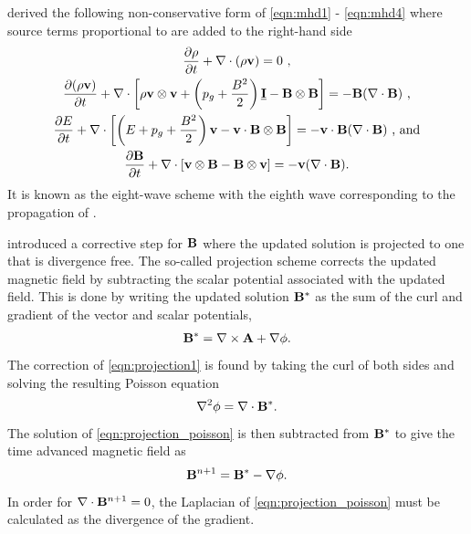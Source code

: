\citet{Powell:1999} derived the following non-conservative form of \eqref{eqn:mhd1} - \eqref{eqn:mhd4} where source terms proportional to  are added to the right-hand side
\begin{gather}
\label{eqn:8wave1} \frac{\partial \rho}{\partial t} + \mathbf{\nabla} \cdot \left(\rho\mathbf{v}\right) = 0 \text{ ,} \\
\label{eqn:8wave2} \frac{\partial (\rho \mathbf{v})}{\partial t} + \mathbf{\nabla} \cdot \left[ \rho\mathbf{v} \otimes \mathbf{v} + \left( p_g + \frac{B^2}{2}\right)\underline{\mathbf{I}} - \mathbf{B} \otimes \mathbf{B}\right]  = -\mathbf{B}(\mathbf{\nabla} \cdot \mathbf{B}) \text{ ,}\\
\label{eqn:8wave3} \frac{\partial E}{\partial t} + \mathbf{\nabla} \cdot \left[ \left(E + p_g + \frac{B^2}{2}\right)\mathbf{v} - \mathbf{v} \cdot \mathbf{B} \otimes \mathbf{B}\right]  = -\mathbf{v}\cdot\mathbf{B}(\mathbf{\nabla} \cdot \mathbf{B}) \text{ , and} \\
\label{eqn:8wave4} \frac{\partial \mathbf{B}}{\partial t} + \mathbf{\nabla} \cdot \left[ \mathbf{v} \otimes \mathbf{B} - \mathbf{B} \otimes \mathbf{v}\right]  = -\mathbf{v}(\mathbf{\nabla} \cdot \mathbf{B}) \text{.}
\end{gather}
It is known as the eight-wave scheme with the eighth wave corresponding to the propagation of .  

\citet{Brackbill:1980} introduced a corrective step for $\mathbf{B}$ where the updated solution is projected to one that is  divergence free.  The so-called projection scheme corrects the updated magnetic field by subtracting the scalar potential associated with the updated field.  This is done by writing the updated solution $\mathbf{B}^*$ as the sum of the curl and gradient of the vector and scalar potentials,
\begin{gather}
\label{eqn:projection1}
\mathbf{B}^* = \mathbf{\nabla} \times \mathbf{A} + \mathbf{\nabla}\phi.
\end{gather}
The correction of \eqref{eqn:projection1} is found by taking the curl of both sides and solving the resulting Poisson equation
\begin{gather}
\label{eqn:projection_poisson}
\mathbf{\nabla}^2\phi = \mathbf{\nabla} \cdot \mathbf{B}^*.
\end{gather} 
The solution of \eqref{eqn:projection_poisson} is then subtracted from $\mathbf{B}^*$ to give the time advanced magnetic field as
\begin{gather}
\label{eqn:projection2}
\mathbf{B}^{n+1} = \mathbf{B}^* - \mathbf{\nabla}\phi.
\end{gather} 
In order for $\mathbf{\nabla} \cdot \mathbf{B}^{n+1} = 0$, the Laplacian of \eqref{eqn:projection_poisson} must be calculated as the divergence of the gradient.

